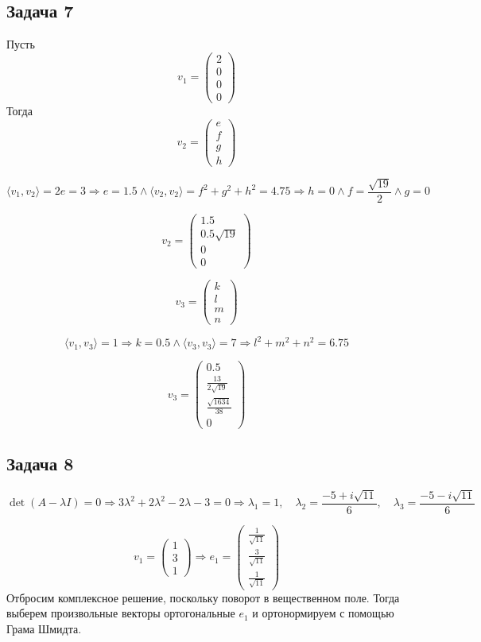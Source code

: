 \documentclass[a4paper,12pt]{article}
\begin{document}
\subsection{Задача 7}
Пусть 
\[
v_1 = \begin{pmatrix}
    2 \\ 0 \\ 0 \\ 0
\end{pmatrix}
\]
Тогда 
\[
v_2 = \begin{pmatrix}
    e \\ f \\ g \\ h
\end{pmatrix}
\]

\[
\langle v_1, v_2 \rangle = 2e = 3 \Rightarrow e = 1.5 \land \langle v_2, v_2 \rangle = f^2 + g^2 + h^2 = 4.75 \Rightarrow h = 0 \land f = \frac{\sqrt{19}}{2} \land g = 0
\]

\[
v_2 = \begin{pmatrix}
    1.5 \\ 0.5\sqrt{19} \\ 0 \\ 0
\end{pmatrix}
\]

\[
v_3 = \begin{pmatrix}
    k \\ l \\ m \\ n
\end{pmatrix}
\]

\[
\langle v_1, v_3 \rangle = 1 \Rightarrow k = 0.5 \land \langle v_3, v_3 \rangle = 7 \Rightarrow l^2+m^2+n^2 = 6.75
\]

\[
v_3 = \begin{pmatrix} 0.5 \\ \frac{13}{2\sqrt{19}} \\ \frac{\sqrt{1634}}{38} \\ 0 \end{pmatrix}
\]

\subsection{Задача 8}

\[
\det(A-\lambda I) = 0 \Rightarrow 3\lambda^2 +2\lambda^2 -2\lambda - 3 = 0 \Rightarrow \lambda_1 = 1, \quad \lambda_2 = \dfrac{-5 + i\sqrt{11}}{6}, \quad \lambda_3 = \dfrac{-5 - i\sqrt{11}}{6}
\]

\[
v_1 = \begin{pmatrix}
    1 \\ 3 \\ 1
\end{pmatrix} \Rightarrow e_1 = \begin{pmatrix}
    \frac{1}{\sqrt{11}} \\ \frac{3}{\sqrt{11}} \\ \frac{1}{\sqrt{11}}
\end{pmatrix}
\]
Отбросим комплексное решение, поскольку поворот в вещественном поле. Тогда выберем произвольные векторы ортогональные $e_1$ и ортонормируем с помощью Грама Шмидта.
\end{document}
